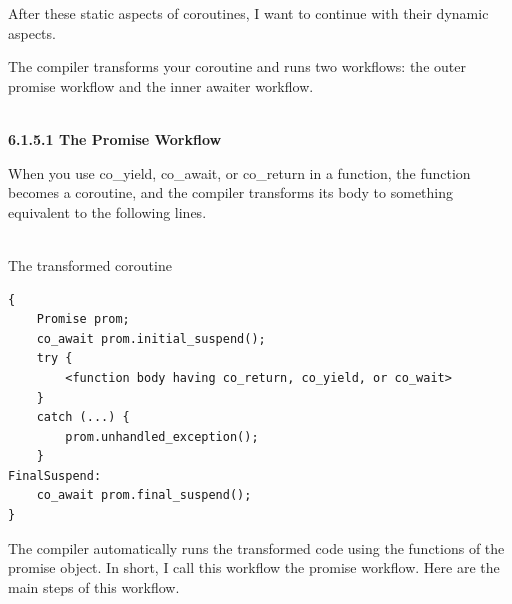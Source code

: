 After these static aspects of coroutines, I want to continue with their dynamic aspects.


The compiler transforms your coroutine and runs two workflows: the outer promise workflow and the inner awaiter workflow.

\hspace*{\fill} \\ %
\noindent
\textbf{6.1.5.1\hspace{0.2cm} The Promise Workflow}

When you use co\_yield, co\_await, or co\_return in a function, the function becomes a coroutine, and the compiler transforms its body to something equivalent to the following lines.

\hspace*{\fill} \\ %
\noindent
The transformed coroutine
\begin{lstlisting}[style=styleCXX]
{
	Promise prom;
	co_await prom.initial_suspend();
	try {
		<function body having co_return, co_yield, or co_wait>
	}
	catch (...) {
		prom.unhandled_exception();
	}
FinalSuspend:
	co_await prom.final_suspend();
}
\end{lstlisting}

The compiler automatically runs the transformed code using the functions of the promise object. In short, I call this workflow the promise workflow. Here are the main steps of this workflow.

